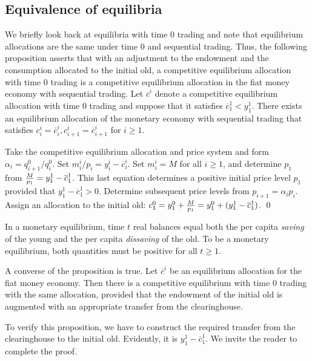 \subsection{Equivalence of equilibria}
   We briefly look back at  equilibria with
time $0$ trading and note that   equilibrium allocations are
the same under time $0$ and sequential trading.
Thus, the following proposition
asserts that  with an adjustment to the endowment and the consumption allocated
to the initial old, a competitive equilibrium
allocation with time $0$ trading
is a competitive equilibrium  allocation in the fiat money economy with
sequential trading.
\medskip
{}  Let $\overline c^i$ denote a competitive equilibrium
 allocation with time $0$ trading
  and suppose that it satisfies
$\overline c^1_1 <  y^1_1$.
There exists
an equilibrium allocation  of the monetary economy with sequential trading 
 that satisfies $c^i_i = \overline c^i_i, c^i_{i+1} = \overline
c^i_{i+1}$ for $i \geq 1$.

\medskip
{}  Take the competitive equilibrium allocation
and  price system and form $ \alpha_i = q^0_{i+1}/q^0_i$.  Set
$m_i^i/p_i = y_i^i - \overline c_i^i$. Set $m_i^i = M$ for all $i \geq 1$,
and   determine $p_1$ from ${M \over p_1} = y_1^1  - \overline c_1^1$.
This last equation determines a positive initial price level
$p_1$ provided that $y_1^1 - \overline c_1^1 >0$.  Determine
subsequent price levels from $p_{i+1} = \alpha_i p_i$.
Assign an allocation to the  initial old: %
$c^0_1 = y^0_1 + {M \over p_1} = y^0_1 +(y_1^1 - \overline c_1^1)$.  \qed

\medskip
In a monetary equilibrium, time $t$ real balances
equal both the per capita {\it saving\/} of the young and the
per capita {\it dissaving\/} of the old. To be a monetary equilibrium, both quantities must
be positive for all $t \geq 1$.


A converse of the proposition is true.
\medskip
{}  Let    $\overline c^i$ be an
equilibrium allocation for the fiat money economy.    Then
there is a competitive equilibrium with time $0$ trading
with the same allocation, provided that the endowment
of the initial old is augmented with an appropriate  transfer
from the clearinghouse.
\medskip

To  verify this proposition, we have to construct
the required transfer from the clearinghouse to the initial
old.  Evidently, it is $y^1_1 - \overline c^1_1$.  We invite
the reader to complete  the proof.



